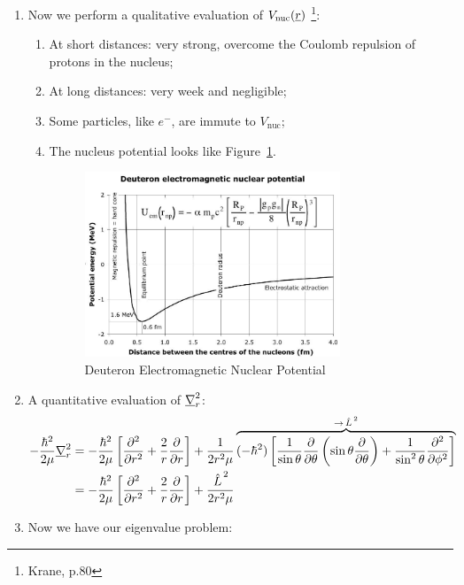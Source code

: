 \documentclass{school-22.101-notes}
\begin{document}
\begin{enumerate}
\item Now we perform a qualitative evaluation of $V_{\mathrm{nuc}} (\underline{r})$ \footnote{Krane, p.80}: 
    \begin{enumerate}
    \item At short distances: very strong, overcome the Coulomb repulsion of protons in the nucleus; 
    \item At long distances: very week and negligible; 
    \item Some particles, like $e^-$, are immute to $V_{\mathrm{nuc}}$;
    \item The nucleus potential looks like Figure~\ref{nuclear-potential-radius}. 
    \begin{figure}
        \centering
        \includegraphics[width=3in]{images/deuteron/nuclear-potential-radius.png}
        \caption{Deuteron Electromagnetic Nuclear Potential\label{nuclear-potential-radius}}
    \end{figure}
    \end{enumerate}

\item A quantitative evaluation of $\underline{\nabla}_r^2$: 
\begin{align}
- \frac{\hbar^2}{2 \mu} \underline{\nabla}_r^2 &= - \frac{\hbar^2}{2 \mu} \left[ \frac{\partial^{2} }{\partial r ^{2}} + \frac{2}{r} \frac{\partial}{\partial r} \right] + \frac{1}{2 r^2 \mu} \overbrace{ (-\hbar^2) \left[ \frac{1}{\sin \theta} \frac{\partial}{\partial \theta} \left( \sin \theta \frac{\partial}{\partial \theta} \right) + \frac{1}{\sin^2 \theta} \frac{\partial^{2} }{\partial \phi ^{2}} \right]}^{\to \left. \hat{L} \right.^2}  \\
&= - \frac{\hbar^2}{2 \mu} \left[ \frac{\partial^{2} }{\partial r ^{2}} + \frac{2}{r} \frac{\partial}{\partial r} \right] + \frac{\left. \hat{L} \right.^2}{2 r^2 \mu} 
\end{align}

\item Now we have our eigenvalue problem:


\end{enumerate}
\end{document}
